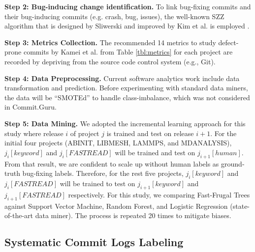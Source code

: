 \documentclass[10pt,conference]{IEEEtran}
\begin{document}
\noindent \textbf{Step 2: Bug-inducing change identification.} To link bug-fixing commits and their bug-inducing commits (e.g. crash, bug, issues), the well-known SZZ algorithm that is designed by Sliwerski and improved by Kim et al. is employed \cite{Sliwerski05changes, Kim08changes}.  

\noindent \textbf{Step 3: Metrics Collection.} The recommended 14 metrics to study defect-prone commits by Kamei et al. \cite{kamei12_jit} from Table \ref{tbl:metrics} for each project are recorded by depriving from the source code control system (e.g., Git).  

\noindent \textbf{Step 4: Data Preprocessing.} Current software analytics work include data transformation and prediction. Before experimenting with standard data miners, the data will be ``SMOTEd'' to handle class-imbalance, which was not considered in Commit.Guru. 

\noindent \textbf{Step 5: Data Mining.} We adopted the incremental learning approach for this study where release $i$ of project $j$ is trained and test on release $i+1$. 
For the initial four projects (ABINIT, LIBMESH, LAMMPS, and MDANALYSIS), $j_i[keyword]$ and $j_i[FASTREAD]$ will be trained and test on $j_{i+1}[human]$. From that result, we are confident to scale up without human labels as ground-truth bug-fixing labels. 
Therefore, for the rest five projects, $j_i[keyword]$ and $j_i[FASTREAD]$ \hspace{0.05cm} will be trained to test on \hspace{0.05cm} $j_{i+1}[keyword]$ \hspace{0.05cm} and $j_{i+1}[FASTREAD]$ respectively. 
For this study, we comparing Fast-Frugal Trees against Support Vector Machine, Random Forest, and Logistic Regression (state-of-the-art data miner). The process is repeated 20 times to mitigate biases.  


\subsection{Systematic Commit Logs Labeling}
\end{document}
